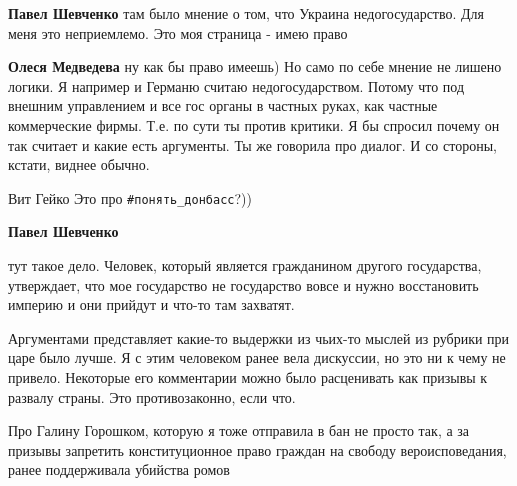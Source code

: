 \begin{itemize}
\begin{itemize}
\textbf{Павел Шевченко} там было мнение о том, что Украина недогосударство. Для меня это неприемлемо. Это моя страница - имею право

 
\textbf{Олеся Медведева} ну как бы право имеешь) Но само по себе мнение не лишено логики. Я например и Германю считаю недогосударством. Потому что под внешним управлением и все гос органы в частных руках, как частные коммерческие фирмы. Т.е. по сути ты против критики. Я бы спросил почему он так считает и какие есть аргументы. Ты же говорила про диалог. И со стороны, кстати, виднее обычно.

 
Вит Гейко Это про \verb|#понять_донбасс|?))

 
\textbf{Павел Шевченко} 

тут такое дело. Человек, который является гражданином другого государства,
утверждает, что мое государство не государство вовсе и нужно восстановить
империю и они прийдут и что-то там захватят.

Аргументами представляет какие-то выдержки из чьих-то мыслей из рубрики при
царе было лучше. Я с этим человеком ранее вела дискуссии, но это ни к чему не
привело. Некоторые его комментарии можно было расценивать как призывы к развалу
страны. Это противозаконно, если что.

Про Галину Горошком, которую я тоже отправила в бан не просто так, а за призывы
запретить конституционное право граждан на свободу вероисповедания, ранее
поддерживала убийства ромов

 

\end{itemize}
\end{itemize}
